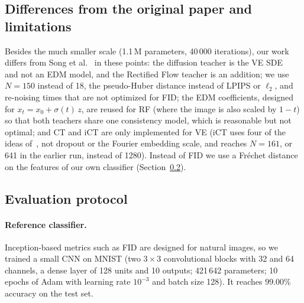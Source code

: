 \documentclass{article}
\begin{document}
\subsection{Differences from the original paper and limitations}
\label{sec:differences}

Besides the much smaller scale (1.1\,M parameters, 40\,000 iterations), our work
differs from Song et al.~\cite{song2023consistency} in these points: the
diffusion teacher is the VE SDE~\cite{song2021sde} and not an EDM model, and the
Rectified Flow teacher is an addition; we use $N = 150$ instead of 18, the
pseudo-Huber distance instead of LPIPS or $\ell_2$, and re-noising times that are
not optimized for FID; the EDM coefficients, designed for
$x_t = x_0 + \sigma(t)\, z$, are reused for RF (where the image is also scaled by
$1 - t$) so that both teachers share one consistency model, which is reasonable
but not optimal; and CT and iCT are only implemented for VE (iCT uses four of the
ideas of~\cite{song2024improved}, not dropout or the Fourier embedding scale, and
reaches $N = 161$, or 641 in the earlier run, instead of 1280). Instead of FID we use a Fréchet distance on
the features of our own classifier (Section~\ref{sec:evaluation}).

\subsection{Evaluation protocol}
\label{sec:evaluation}

\paragraph{Reference classifier.} Inception-based metrics such as FID are
designed for natural images, so we trained a small CNN on MNIST (two $3\times3$
convolutional blocks with 32 and 64 channels, a dense layer of 128 units and 10
outputs; 421\,642 parameters; 10 epochs of Adam with learning rate $10^{-3}$ and
batch size 128). It reaches 99.00\% accuracy on the test set.
\end{document}

